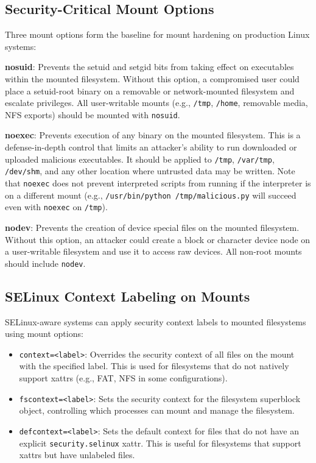 \begin{securitybox}

\subsection*{Security-Critical Mount Options}

Three mount options form the baseline for mount hardening on production Linux systems:

\textbf{nosuid}: Prevents the setuid and setgid bits from taking effect on executables within the mounted filesystem. Without this option, a compromised user could place a setuid-root binary on a removable or network-mounted filesystem and escalate privileges. All user-writable mounts (e.g., \texttt{/tmp}, \texttt{/home}, removable media, NFS exports) should be mounted with \texttt{nosuid}.

\textbf{noexec}: Prevents execution of any binary on the mounted filesystem. This is a defense-in-depth control that limits an attacker's ability to run downloaded or uploaded malicious executables. It should be applied to \texttt{/tmp}, \texttt{/var/tmp}, \texttt{/dev/shm}, and any other location where untrusted data may be written. Note that \texttt{noexec} does not prevent interpreted scripts from running if the interpreter is on a different mount (e.g., \texttt{/usr/bin/python /tmp/malicious.py} will succeed even with \texttt{noexec} on \texttt{/tmp}).

\textbf{nodev}: Prevents the creation of device special files on the mounted filesystem. Without this option, an attacker could create a block or character device node on a user-writable filesystem and use it to access raw devices. All non-root mounts should include \texttt{nodev}.

\subsection*{SELinux Context Labeling on Mounts}

SELinux-aware systems can apply security context labels to mounted filesystems using mount options:

\begin{itemize}
  \item \texttt{context=<label>}: Overrides the security context of all files on the mount with the specified label. This is used for filesystems that do not natively support xattrs (e.g., FAT, NFS in some configurations).
  \item \texttt{fscontext=<label>}: Sets the security context for the filesystem superblock object, controlling which processes can mount and manage the filesystem.
  \item \texttt{defcontext=<label>}: Sets the default context for files that do not have an explicit \texttt{security.selinux} xattr. This is useful for filesystems that support xattrs but have unlabeled files.
\end{itemize}


\end{securitybox}
